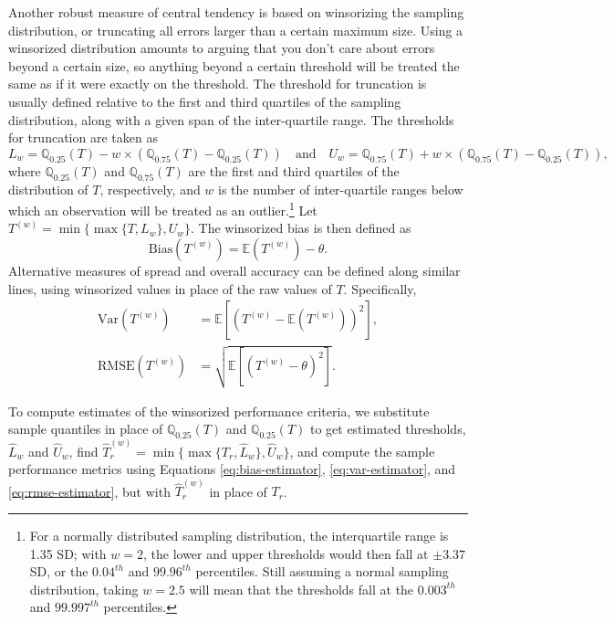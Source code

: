 \documentclass[
]{book}
\newcommand{\E}{\mathbb{E}}
\newcommand{\Q}{\mathbb{Q}}
\newcommand{\Var}{\text{Var}}
\newcommand{\RMSE}{\text{RMSE}}
\begin{document}
Another robust measure of central tendency is based on winsorizing the sampling distribution, or truncating all errors larger than a certain maximum size.
Using a winsorized distribution amounts to arguing that you don't care about errors beyond a certain size, so anything beyond a certain threshold will be treated the same as if it were exactly on the threshold.
The threshold for truncation is usually defined relative to the first and third quartiles of the sampling distribution, along with a given span of the inter-quartile range.
The thresholds for truncation are taken as
\[
L_w = \Q_{0.25}(T) - w \times (\Q_{0.75}(T) - \Q_{0.25}(T)) \quad \text{and} \quad U_w = \Q_{0.75}(T) + w \times (\Q_{0.75}(T) - \Q_{0.25}(T)),
\]
where \(\Q_{0.25}(T)\) and \(\Q_{0.75}(T)\) are the first and third quartiles of the distribution of \(T\), respectively, and \(w\) is the number of inter-quartile ranges below which an observation will be treated as an outlier.\footnote{For a normally distributed sampling distribution, the interquartile range is 1.35 SD; with \(w = 2\), the lower and upper thresholds would then fall at \(\pm 3.37\) SD, or the \(0.04^{th}\) and \(99.96^{th}\) percentiles.
  Still assuming a normal sampling distribution, taking \(w = 2.5\) will mean that the thresholds fall at the \(0.003^{th}\) and \(99.997^{th}\) percentiles.}
Let \(T^{(w)} = \min\{\max\{T, L_w\}, U_w\}\).
The winsorized bias is then defined as
\[
\text{Bias}(T^{(w)}) = \E\left(T^{(w)}\right) - \theta. 
\label{eq:winsorized-bias}
\]
Alternative measures of spread and overall accuracy can be defined along similar lines, using winsorized values in place of the raw values of \(T\).
Specifically,
\[
\begin{aligned}
\Var\left(T^{(w)}\right) &= \E\left[\left(T^{(w)} - \E (T^{(w)})\right)^2 \right], \\
\RMSE\left(T^{(w)}\right) &= \sqrt{\E\left[\left(T^{(w)} - \theta\right)^2 \right]}.
\end{aligned}
\label{eq:winsorized-variance-RMSE}
\]

To compute estimates of the winsorized performance criteria, we substitute sample quantiles in place of \(\Q_{0.25}(T)\) and \(\Q_{0.25}(T)\) to get estimated thresholds, \(\hat{L}_w\) and \(\hat{U}_w\), find \(\hat{T}_r^{(w)} = \min\{\max\{T_r, \hat{L}_w\}, \hat{U}_w\}\), and compute the sample performance metrics using Equations \eqref{eq:bias-estimator}, \eqref{eq:var-estimator}, and \eqref{eq:rmse-estimator}, but with \(\hat{T}_r^{(w)}\) in place of \(T_r\).
\end{document}
